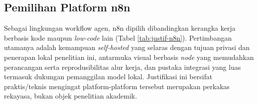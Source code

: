 \begin{table}[H]
    \centering
    \caption{Perbandingan RAG dengan Alternatif Injeksi Pengetahuan}
    \label{tab:justif-rag}
\end{table}

\subsection{Pemilihan Platform n8n}
Sebagai lingkungan \gls{workflow} agen, n8n dipilih dibandingkan kerangka kerja berbasis kode maupun \textit{low-code} lain (Tabel \ref{tab:justif-n8n}). Pertimbangan utamanya adalah kemampuan \textit{self-hosted} yang selaras dengan tujuan privasi dan penerapan lokal penelitian ini, antarmuka visual berbasis \textit{node} yang memudahkan perancangan serta reprodusibilitas alur kerja, dan pustaka integrasi yang luas termasuk dukungan pemanggilan model lokal. Justifikasi ini bersifat praktis/teknis mengingat platform-platform tersebut merupakan perkakas rekayasa, bukan objek penelitian akademik.

\begin{table}[H]
    \centering
    \caption{Perbandingan n8n dengan Platform Orkestrasi Alternatif}
    \label{tab:justif-n8n}
\end{table}
